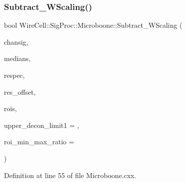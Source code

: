 \subsubsection{\texorpdfstring{Subtract\+\_\+\+W\+Scaling()}{Subtract\_WScaling()}}
{\footnotesize\ttfamily bool Wire\+Cell\+::\+Sig\+Proc\+::\+Microboone\+::\+Subtract\+\_\+\+W\+Scaling (\begin{DoxyParamCaption}\item[{\hyperlink{class_wire_cell_1_1_i_channel_filter_a44de35ce47701d84cd45393c6bcd5e2f}{Wire\+Cell\+::\+I\+Channel\+Filter\+::channel\+\_\+signals\+\_\+t} \&}]{chansig,  }\item[{const \hyperlink{namespace_wire_cell_1_1_waveform_a479175e541c8545e87cd8063b74b6956}{Wire\+Cell\+::\+Waveform\+::realseq\+\_\+t} \&}]{medians,  }\item[{const \hyperlink{namespace_wire_cell_1_1_waveform_a7e4a8d371f774438bb360e7d1dcb583a}{Wire\+Cell\+::\+Waveform\+::compseq\+\_\+t} \&}]{respec,  }\item[{int}]{res\+\_\+offset,  }\item[{std\+::vector$<$ std\+::vector$<$ int $>$ $>$ \&}]{rois,  }\item[{float}]{upper\+\_\+decon\+\_\+limit1 = {},  }\item[{float}]{roi\+\_\+min\+\_\+max\+\_\+ratio = {} }\end{DoxyParamCaption})}



Definition at line 55 of file Microboone.\+cxx.

